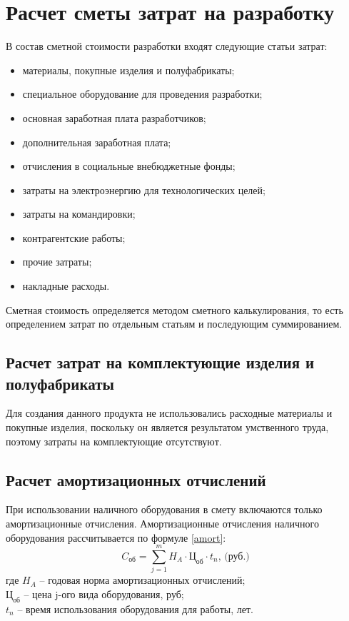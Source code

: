 \section{Расчет сметы затрат на разработку}
В состав сметной стоимости разработки входят следующие статьи затрат:
\begin{itemize}
\item материалы, покупные изделия и полуфабрикаты;
\item специальное оборудование для проведения разработки;
\item основная заработная плата разработчиков;
\item дополнительная заработная плата;
\item отчисления в социальные внебюджетные фонды;
\item затраты на электроэнергию для технологических целей;
\item затраты на командировки;
\item контрагентские работы;
\item прочие затраты;
\item накладные расходы.
\end{itemize}
Сметная стоимость определяется методом сметного калькулирования, то есть определением затрат по отдельным статьям и последующим суммированием.

\subsection{Расчет затрат на комплектующие изделия и полуфабрикаты}
Для создания данного продукта не использовались расходные материалы и покупные изделия, поскольку он является результатом умственного труда, поэтому затраты на комплектующие отсутствуют.
\subsection{Расчет амортизационных отчислений}
При использовании наличного оборудования в смету включаются только амортизационные отчисления. Амортизационные отчисления наличного оборудования рассчитывается по формуле \ref{amort}:
\begin{equation}
C_\textit{об} = \sum_{j=1}^m H_A \cdot \textit{Ц}_\textit{об} \cdot t_n \mbox{, (руб.)}
\label{amort}
\end{equation}
где  $H_A$ – годовая норма амортизационных отчислений;\\
$\textit{Ц}_\textit{об}$ – цена j-ого вида оборудования, руб;\\
$t_n$ – время использования оборудования для работы, лет.

